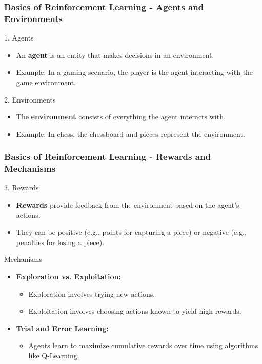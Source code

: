 \documentclass[aspectratio=169]{beamer}
\begin{document}
\begin{frame}[fragile]
    \frametitle{Basics of Reinforcement Learning - Agents and Environments}
    \begin{block}{1. Agents}
        \begin{itemize}
            \item An \textbf{agent} is an entity that makes decisions in an environment.
            \item Example: In a gaming scenario, the player is the agent interacting with the game environment.
        \end{itemize}
    \end{block}
    
    \begin{block}{2. Environments}
        \begin{itemize}
            \item The \textbf{environment} consists of everything the agent interacts with.
            \item Example: In chess, the chessboard and pieces represent the environment.
        \end{itemize}
    \end{block}
\end{frame}

\begin{frame}[fragile]
    \frametitle{Basics of Reinforcement Learning - Rewards and Mechanisms}
    \begin{block}{3. Rewards}
        \begin{itemize}
            \item \textbf{Rewards} provide feedback from the environment based on the agent's actions.
            \item They can be positive (e.g., points for capturing a piece) or negative (e.g., penalties for losing a piece).
        \end{itemize}
    \end{block}

    \begin{block}{Mechanisms}
        \begin{itemize}
            \item \textbf{Exploration vs. Exploitation:}
                \begin{itemize}
                    \item Exploration involves trying new actions.
                    \item Exploitation involves choosing actions known to yield high rewards.
                \end{itemize}
            \item \textbf{Trial and Error Learning:} 
                \begin{itemize}
                    \item Agents learn to maximize cumulative rewards over time using algorithms like Q-Learning.
                \end{itemize}
        \end{itemize}
    \end{block}
\end{frame}
\end{document}
